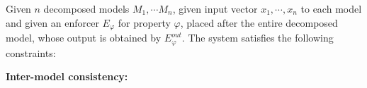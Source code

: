\begin{definition}
 Given $n$ decomposed models $M_1, \cdots M_n$, given input vector $x_1, \cdots, x_n$ to each model and given an enforcer $E_{\varphi}$ for property $\varphi$, placed after the entire decomposed model, whose output is obtained by $E^{out}_{\varphi}$. %
 The system satisfies the following constraints:
 \begin{flushleft}
 \textbf{Inter-model consistency:}
 \end{flushleft}


\end{definition}
